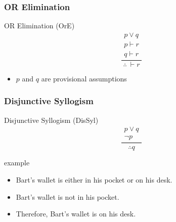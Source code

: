 \documentclass[dvipsnames]{beamer}
\begin{document}
\begin{frame}
  \frametitle{OR Elimination}

  \begin{block}{OR Elimination (OrE)}
    \[
    \frac
      {
        \begin{array}{c}
          p \vee q\\
          p \vdash r\\
          q \vdash r
        \end{array}
      }
      {
        \therefore ~ \vdash r
      }
    \]
  \end{block}

  \begin{itemize}
    \item $p$ and $q$ are provisional assumptions
  \end{itemize}
\end{frame}

\begin{frame}
  \frametitle{Disjunctive Syllogism}

  \begin{block}{Disjunctive Syllogism (DisSyl)}
    \[
    \frac
      {
        \begin{array}{c}
          p \vee q\\
          \neg p
        \end{array}
      }
      {
        \therefore q
      }
    \]
  \end{block}

  \pause
  \begin{exampleblock}{example}
    \begin{itemize}
      \item Bart's wallet is either in his pocket or on his desk.
      \item Bart's wallet is not in his pocket.

      \medskip
      \item Therefore, Bart's wallet is on his desk.
    \end{itemize}
  \end{exampleblock}
\end{frame}
\end{document}
